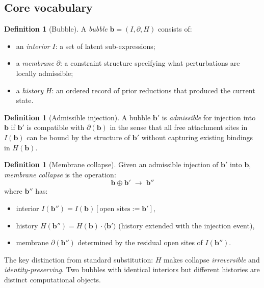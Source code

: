 \documentclass[12pt, a4paper]{article}
\theoremstyle{plain}
\theoremstyle{definition}
\newtheorem{definition}[theorem]{Definition}
\theoremstyle{remark}
\newcommand{\subst}[3]{#1[#2 \mathrel{:=} #3]}
\begin{document}
\subsection{Core vocabulary}

\begin{definition}[Bubble]
  A \emph{bubble} $\mathbf{b} = (I, \partial, H)$ consists of:
  \begin{itemize}
    \item an \emph{interior} $I$: a set of latent sub-expressions;
    \item a \emph{membrane} $\partial$: a constraint structure
          specifying what perturbations are locally admissible;
    \item a \emph{history} $H$: an ordered record of prior reductions
          that produced the current state.
  \end{itemize}
\end{definition}

\begin{definition}[Admissible injection]
  A bubble $\mathbf{b}'$ is \emph{admissible} for injection into
  $\mathbf{b}$ if $\mathbf{b}'$ is compatible with $\partial(\mathbf{b})$
  in the sense that all free attachment sites in $I(\mathbf{b})$
  can be bound by the structure of $\mathbf{b}'$ without capturing
  existing bindings in $H(\mathbf{b})$.
\end{definition}

\begin{definition}[Membrane collapse]
  Given an admissible injection of $\mathbf{b}'$ into $\mathbf{b}$,
  \emph{membrane collapse} is the operation:
  \[
    \mathbf{b} \oplus \mathbf{b}' \;\longrightarrow\; \mathbf{b}''
  \]
  where $\mathbf{b}''$ has:
  \begin{itemize}
    \item interior $I(\mathbf{b}'') = \subst{I(\mathbf{b})}
          {\text{open sites}}{\mathbf{b}'}$,
    \item history $H(\mathbf{b}'') = H(\mathbf{b}) \cdot \langle\mathbf{b}'\rangle$
          (history extended with the injection event),
    \item membrane $\partial(\mathbf{b}'')$ determined by the residual
          open sites of $I(\mathbf{b}'')$.
  \end{itemize}
\end{definition}

The key distinction from standard substitution: $H$ makes collapse
\emph{irreversible} and \emph{identity-preserving}.
Two bubbles with identical interiors but different histories are
distinct computational objects.
\end{document}
